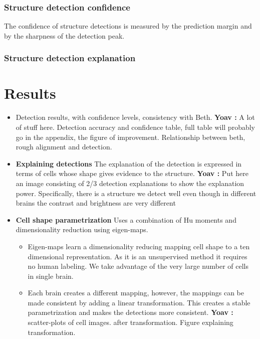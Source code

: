 \documentclass[runningheads]{llncs}
\newcommand{\comment}[3]{{\color{#1} {\bf #2 :} #3}}
\newcommand{\yoav}[1]{\comment{red}{Yoav}{#1}}
\begin{document}
\subsubsection { Structure detection confidence} The confidence of structure
  detections is measured by the prediction margin and by the sharpness
  of the detection peak.
\subsubsection { Structure detection explanation}

\section{Results}
\begin{itemize}
    \item Detection results, with confidence levels, consistency with Beth.
    \yoav{A lot of stuff here. Detection accuracy and confidence table, full table will probably go in the appendix, the figure of improvement. Relationship between beth, rough alignment and detection.}
    \item {\bf Explaining detections} The explanation of the detection is expressed in terms of cells whose shape gives evidence to the structure.
    \yoav{Put here an image consisting of 2/3 detection explanations to show the explanation power. Specifically, there is a structure we detect well even though in different brains the contrast and brightness are very different}
\item {\bf Cell shape parametrization} Uses a combination of Hu moments and dimensionality reduction using eigen-maps.
\begin{itemize}
    \item Eigen-maps learn a dimensionality reducing mapping cell shape to a ten dimensional representation.
    As it is an unsupervised method it requires no human labeling. We take advantage of the very large number of cells in single brain. 
    \item Each brain creates a different mapping, however, the mappings can be made consistent by adding a linear transformation. This creates a stable parametrization and makes the detections more consistent.\yoav{scatter-plots of cell images. after transformation. Figure explaining transformation.}
\end{itemize}

\end{itemize}
\end{document}
